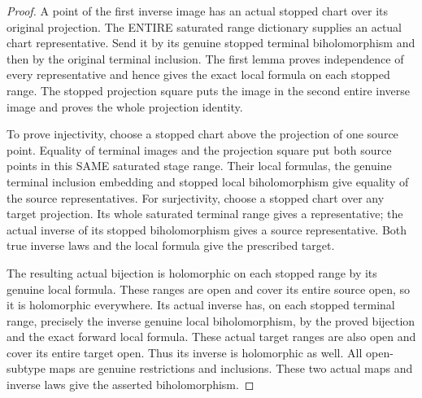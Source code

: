 \begin{proof}
A point of the first inverse image has an actual stopped chart over its
original projection. The ENTIRE saturated range dictionary supplies an
actual chart representative. Send it by its genuine stopped terminal
biholomorphism and then by the original terminal inclusion. The first
lemma proves independence of every representative and hence gives the
exact local formula on each stopped range. The stopped projection square
puts the image in the second entire inverse image and proves the whole
projection identity.

To prove injectivity, choose a stopped chart above the projection of one
source point. Equality of terminal images and the projection square put
both source points in this SAME saturated stage range. Their local
formulas, the genuine terminal inclusion embedding and stopped local
biholomorphism give equality of the source representatives. For
surjectivity, choose a stopped chart over any target projection. Its
whole saturated terminal range gives a representative; the actual inverse
of its stopped biholomorphism gives a source representative. Both true
inverse laws and the local formula give the prescribed target.

The resulting actual bijection is holomorphic on each stopped range by
its genuine local formula. These ranges are open and cover its entire
source open, so it is holomorphic everywhere. Its actual inverse has,
on each stopped terminal range, precisely the inverse genuine local
biholomorphism, by the proved bijection and the exact forward local
formula. These actual target ranges are also open and cover its entire
target open. Thus its inverse is holomorphic as well. All open-subtype
maps are genuine restrictions and inclusions. These two actual maps and
inverse laws give the asserted biholomorphism.
\end{proof}

